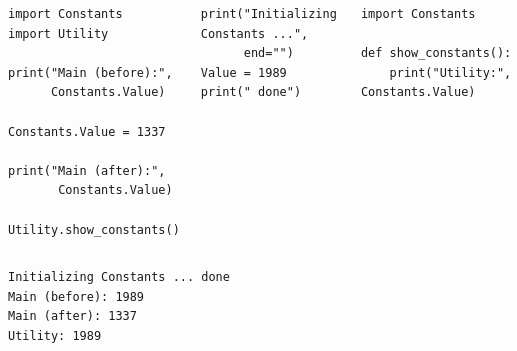 \begin{frame}[fragile]
%
\vspace{-12pt}
\begin{columns}[T]
\begin{codebox}
\begin{verbatim}
import Constants
import Utility

print("Main (before):",
      Constants.Value)

Constants.Value = 1337

print("Main (after):",
       Constants.Value)

Utility.show_constants()
\end{verbatim}
\end{codebox}
%
\begin{codebox}
\begin{verbatim}
print("Initializing Constants ...",
      end="")
Value = 1989
print(" done")
\end{verbatim}
\end{codebox}
%
\vspace{-10pt}
\begin{codebox}
\begin{verbatim}
import Constants

def show_constants():
    print("Utility:", Constants.Value)
\end{verbatim}
\end{codebox}
\end{columns}
%
\vspace{-4pt}
\begin{cmdbox}[Output]
\begin{verbatim}
Initializing Constants ... done
Main (before): 1989
Main (after): 1337
Utility: 1989
\end{verbatim}
\end{cmdbox}
%
\end{frame}


